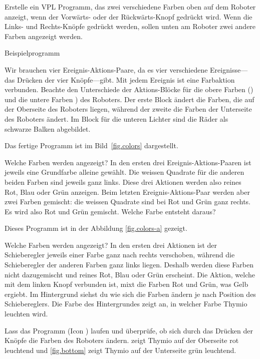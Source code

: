 

Erstelle ein VPL Programm, das zwei verschiedene Farben oben auf dem Roboter
anzeigt, wenn der Vorwärts- oder der Rückwärts-Knopf gedrückt wird. Wenn die
Links- und Rechts-Knöpfe gedrückt werden, sollen unten am Roboter zwei andere
Farben angezeigt werden.

{\raggedleft \hfill Beispielprogramm }

Wir brauchen vier Ereignis-Aktions-Paare, da es vier verschiedene
Ereignisse---das Drücken der vier Knöpfe---gibt. Mit jedem Ereignis ist eine Farbaktion verbunden. 
Beachte den Unterschiede der Aktions-Blöcke für die obere Farben () und 
die untere Farben ) des Roboters. Der erste Block ändert die Farben, die auf der Oberseite des Roboters liegen, während der zweite die Farben der Unterseite des Roboters ändert. Im Block für die unteren Lichter sind die Räder als schwarze Balken abgebildet.

Das fertige Programm ist im Bild~\ref{fig.colors} dargestellt.

Welche Farben werden angezeigt? In den ersten drei Ereignis-Aktions-Paaren ist
jeweils eine Grundfarbe alleine gewählt. Die weissen Quadrate für die anderen
beiden Farben sind jeweils ganz links. Diese drei Aktionen werden also reines
Rot, Blau oder Grün anzeigen. Beim letzten Ereignis-Aktions-Paar werden aber
zwei Farben gemischt: die weissen Quadrate sind bei Rot und Grün ganz rechts.
Es wird also Rot und Grün gemischt. Welche Farbe entsteht daraus?

Dieses Programm ist in der Abbildung \cref{fig.colors-a} gezeigt.

Welche Farben werden angezeigt? In den ersten drei Aktionen ist der Schieberegler jeweils einer Farbe ganz nach rechts verschoben, während die Schieberegler der anderen Farben ganz links liegen. Deshalb werden diese Farben nicht dazugemischt und reines Rot, Blau oder Grün erscheint.
Die Aktion, welche mit dem linken Knopf verbunden ist, mixt die Farben Rot und Grün, was Gelb ergiebt.
Im Hintergrund siehst du wie sich die Farben ändern je nach Position des Schiebereglers. Die Farbe des Hintergrundes zeigt an, in welcher Farbe Thymio leuchten wird.

Lass das Programm (Icon ) laufen und überprüfe, ob sich durch das Drücken der Knöpfe die Farben des Roboters ändern.
  zeigt Thymio auf der Oberseite rot leuchtend und \cref{fig.bottom} zeigt Thymio auf der Unterseite grün leuchtend.

